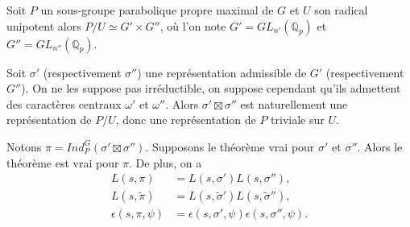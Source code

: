 Soit $P$ un sous-groupe parabolique propre maximal de $G$ et $U$ son radical unipotent alors $P/U \simeq G' \times G''$, où l'on note $G'=GL_{n'}(\mathbb{Q}_p)$ et $G''=GL_{n''}(\mathbb{Q}_p)$.

Soit $\sigma'$ (respectivement $\sigma''$) une représentation admissible de $G'$ (respectivement $G''$). On ne les suppose pas irréductible, on suppose cependant qu'ils admettent des caractères centraux $\omega'$ et $\omega''$. Alors $\sigma' \boxtimes \sigma''$ est naturellement une représentation de $P/U$, donc une représentation de $P$ triviale sur $U$.
\begin{proposition}
Notons $\pi = Ind_P^G(\sigma' \boxtimes \sigma'')$. Supposons le théorème vrai pour $\sigma'$ et $\sigma''$. Alors le théorème est vrai pour $\pi$. De plus, on a
\begin{align}
L(s,\pi)&=L(s,\sigma')L(s,\sigma''), \\
L(s,\tilde{\pi})&=L(s,\tilde{\sigma}')L(s,\tilde{\sigma}''), \\
\epsilon(s,\pi,\psi)&=\epsilon(s,\sigma',\psi)\epsilon(s,\sigma'',\psi).
\end{align}
\end{proposition}

